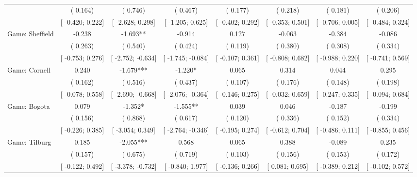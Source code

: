 \begin{tabular}{l*{7}{c}}
                    &(    0.164)   &(    0.746)   &(    0.467)   &(    0.177)   &(    0.218)   &(    0.181)   &(    0.206)   \\
                    &[   -0.420;     0.222]   &[   -2.628;     0.298]   &[   -1.205;     0.625]   &[   -0.402;     0.292]   &[   -0.353;     0.501]   &[   -0.706;     0.005]   &[   -0.484;     0.324]   \\
Game: Sheffield &   -0.238   &   -1.693**   &   -0.914   &    0.127   &   -0.063   &   -0.384   &   -0.086   \\
                    &(    0.263)   &(    0.540)   &(    0.424)   &(    0.119)   &(    0.380)   &(    0.308)   &(    0.334)   \\
                    &[   -0.753;     0.276]   &[   -2.752;    -0.634]   &[   -1.745;    -0.084]   &[   -0.107;     0.361]   &[   -0.808;     0.682]   &[   -0.988;     0.220]   &[   -0.741;     0.569]   \\
Game: Cornell &    0.240   &   -1.679***   &   -1.220*   &    0.065   &    0.314   &    0.044   &    0.295   \\
                    &(    0.162)   &(    0.516)   &(    0.437)   &(    0.107)   &(    0.176)   &(    0.148)   &(    0.198)   \\
                    &[   -0.078;     0.558]   &[   -2.690;    -0.668]   &[   -2.076;    -0.364]   &[   -0.146;     0.275]   &[   -0.032;     0.659]   &[   -0.247;     0.335]   &[   -0.094;     0.684]   \\
Game: Bogota &    0.079   &   -1.352*   &   -1.555**   &    0.039   &    0.046   &   -0.187   &   -0.199   \\
                    &(    0.156)   &(    0.868)   &(    0.617)   &(    0.120)   &(    0.336)   &(    0.152)   &(    0.334)   \\
                    &[   -0.226;     0.385]   &[   -3.054;     0.349]   &[   -2.764;    -0.346]   &[   -0.195;     0.274]   &[   -0.612;     0.704]   &[   -0.486;     0.111]   &[   -0.855;     0.456]   \\
Game: Tilburg &    0.185   &   -2.055***   &    0.568   &    0.065   &    0.388   &   -0.089   &    0.235   \\
                    &(    0.157)   &(    0.675)   &(    0.719)   &(    0.103)   &(    0.156)   &(    0.153)   &(    0.172)   \\
                    &[   -0.122;     0.492]   &[   -3.378;    -0.732]   &[   -0.840;     1.977]   &[   -0.136;     0.266]   &[    0.081;     0.695]   &[   -0.389;     0.212]   &[   -0.102;     0.572]   \\

\end{tabular}
